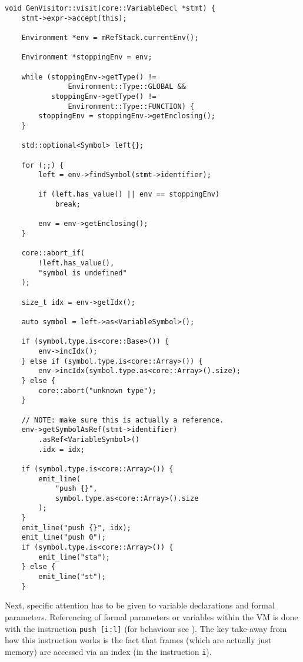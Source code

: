 \begin{lstlisting}[caption={The \texttt{visit(VariableDecl *)}
method in the \texttt{GenVisitor} class
(ir\_gen/GenVisitor.cpp)}, label=lst:formalparam]
void GenVisitor::visit(core::VariableDecl *stmt) {
    stmt->expr->accept(this);

    Environment *env = mRefStack.currentEnv();

    Environment *stoppingEnv = env;

    while (stoppingEnv->getType() !=
               Environment::Type::GLOBAL &&
           stoppingEnv->getType() !=
               Environment::Type::FUNCTION) {
        stoppingEnv = stoppingEnv->getEnclosing();
    }

    std::optional<Symbol> left{};

    for (;;) {
        left = env->findSymbol(stmt->identifier);

        if (left.has_value() || env == stoppingEnv)
            break;

        env = env->getEnclosing();
    }

    core::abort_if(
        !left.has_value(),
        "symbol is undefined"
    );

    size_t idx = env->getIdx();

    auto symbol = left->as<VariableSymbol>();

    if (symbol.type.is<core::Base>()) {
        env->incIdx();
    } else if (symbol.type.is<core::Array>()) {
        env->incIdx(symbol.type.as<core::Array>().size);
    } else {
        core::abort("unknown type");
    }

    // NOTE: make sure this is actually a reference.
    env->getSymbolAsRef(stmt->identifier)
        .asRef<VariableSymbol>()
        .idx = idx;

    if (symbol.type.is<core::Array>()) {
        emit_line(
            "push {}",
            symbol.type.as<core::Array>().size
        );
    }
    emit_line("push {}", idx);
    emit_line("push 0");
    if (symbol.type.is<core::Array>()) {
        emit_line("sta");
    } else {
        emit_line("st");
    }
\end{lstlisting}

Next, specific attention has to be given to variable
declarations and formal parameters. Referencing of formal
parameters or variables within the VM is done with the
instruction \mbox{\texttt{push [i:l]}} (for behaviour see
). The key take-away from how this instruction
works is the fact that frames (which are actually just memory)
are accessed via an index (in the instruction \texttt{i}).

